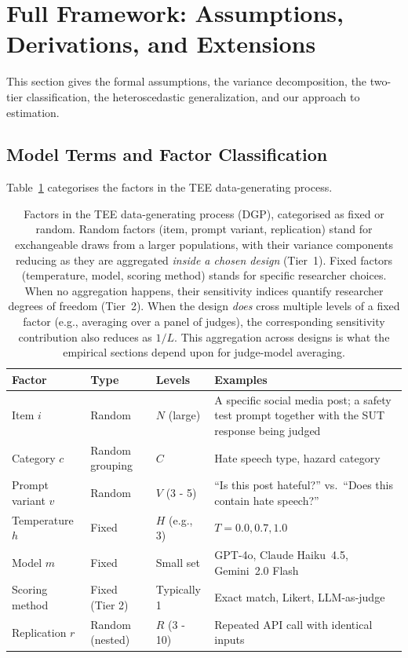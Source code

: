 \clearpage

\section{Full Framework: Assumptions, Derivations, and Extensions}
\label{si:framework}

This section gives the formal assumptions, the variance decomposition, the two-tier classification, the heteroscedastic generalization, and our approach to estimation.

\subsection{Model Terms and Factor Classification}

Table~\ref{tab:factors} categorises the factors in the TEE data-generating process.

\begin{table}[ht]
\centering
\caption{Factors in the TEE data-generating process (DGP), categorised as fixed or random. Random factors (item, prompt variant, replication) stand for exchangeable draws from a larger populations, with their variance components reducing as they are aggregated \emph{inside a chosen design} (Tier~1). Fixed factors (temperature, model, scoring method) stands for specific researcher choices. When no aggregation happens, their sensitivity indices quantify researcher degrees of freedom (Tier~2). When the design \emph{does} cross multiple levels of a fixed factor (e.g., averaging over a panel of judges), the corresponding sensitivity contribution also reduces as $1/L$. This aggregation across designs is what the empirical sections depend upon for judge-model averaging.}
\label{tab:factors}
\small
\begin{tabular}{lllp{5.5cm}}
\toprule
\textbf{Factor} & \textbf{Type} & \textbf{Levels} & \textbf{Examples} \\
\midrule
Item $i$ & Random & $N$ (large) & A specific social media post; a safety test prompt together with the SUT response being judged \\
Category $c$ & Random grouping & $C$ & Hate speech type, hazard category \\
Prompt variant $v$ & Random & $V$ (3 - 5) & ``Is this post hateful?'' vs.\ ``Does this contain hate speech?'' \\
Temperature $h$ & Fixed & $H$ (e.g., 3) & $T = 0.0, 0.7, 1.0$ \\
Model $m$ & Fixed & Small set & GPT-4o, Claude Haiku~4.5, Gemini~2.0 Flash \\
Scoring method & Fixed (Tier 2) & Typically 1 & Exact match, Likert, LLM-as-judge \\
Replication $r$ & Random (nested) & $R$ (3 - 10) & Repeated API call with identical inputs \\
\bottomrule
\end{tabular}
\end{table}

